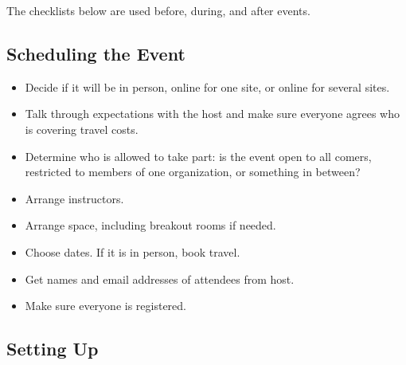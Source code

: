 
The checklists below are used before, during, and after events.

\subsection*{Scheduling the Event}

\begin{itemize}

\item
  Decide if it will be in person,
  online for one site,
  or online for several sites.

\item
  Talk through expectations with the host
  and make sure everyone agrees who is covering travel costs.

\item
  Determine who is allowed to take part:
  is the event open to all comers,
  restricted to members of one organization,
  or something in between?

\item
  Arrange instructors.

\item
  Arrange space, including breakout rooms if needed.

\item
  Choose dates.
  If it is in person, book travel.

\item
  Get names and email addresses of attendees from host.

\item
  Make sure everyone is registered.

\end{itemize}

\subsection*{Setting Up}

